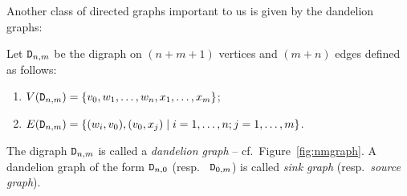 \documentclass{amsart}
\begin{document}
Another class of directed graphs important to us is given by the dandelion graphs:
\begin{defn}\label{dandelion}
Let ${\tt D}_{n,m}$ be the digraph on $(n+m+1)$ vertices  and $(m+n)$ edges defined as follows:
\begin{enumerate}
    \item $V({\tt D}_{n,m}) = \{ v_{0}, w_{1} ,\dots, w_{n}, x_{1},\dots, x_{m} \}$;
    \item $E({\tt D}_{n,m}) = \{ (w_i,v_0), (v_{0},x_j) \mid i=1,\dots,n; j=1,\dots,m \}$.
\end{enumerate}
The digraph ${\tt D}_{n,m}$ is called a \emph{dandelion graph} -- cf.~Figure~\ref{fig:nmgraph}. A dandelion graph of the form ${\tt D}_{n,0}$ (resp.~ ${\tt D}_{0,m}$) is called \emph{sink graph} (resp.~\emph{source graph}).
\end{defn}
\end{document}
